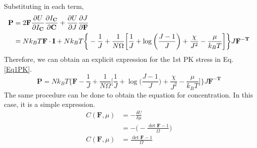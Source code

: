 \documentclass[12pt,3p]{article}
\numberwithin{equation}{section}
\begin{document}
Substituting in each term,
\begin{align*}
\mathbf{P} 
	&=  2 \mathbf{F} \pdv{{U}}{I_\mathbf{C}} \pdv{I_\mathbf{C}}{\mathbf{C}} 
	+ \pdv{U}{J} \pdv{J}{\mathbf{F}} \\
	&= N k_B T \mathbf{F} \cdot \mathbf{I} + N k_B T \bigg\{- \frac{1}{J} + \frac{1}{N \Omega} \bigg[ \frac{1}{J} + \log \bigg( \frac{J - 1}{J} \bigg) + \frac{\chi}{J^2} - \frac{\mu}{k_B T} \bigg] \bigg\} J \mathbf{F^{-T}} 
\end{align*}
Therefore, we can obtain an explicit expression for the 1st PK stress in Eq. \ref{Eq1PK}.
\begin{equation}\label{Eq1PK}
\mathbf{P} 
	= N k_B T \bigg\{\mathbf{F} - \frac{1}{J} + \frac{1}{N \Omega} \bigg[ \frac{1}{J} + \log \bigg( \frac{J - 1}{J} \bigg) + \frac{\chi}{J^2} - \frac{\mu}{k_B T} \bigg] \bigg\} J \mathbf{F^{-T}}
\end{equation}
The same procedure can be done to obtain the equation for concentration. In this case, it is a simple expression.
\begin{subequations}\label{EqConcentration}
\begin{align}
C (\mathbf{F}, \mu) &= - \frac{\delta U}{\delta \mu} \\
	&= - \bigg( - \frac{\det \mathbf{F} - 1}{\Omega} \bigg) \\
						C (\mathbf{F}, \mu) &= \frac{\det \mathbf{F} - 1}{\Omega}
\end{align}
\end{subequations}


\end{document}

